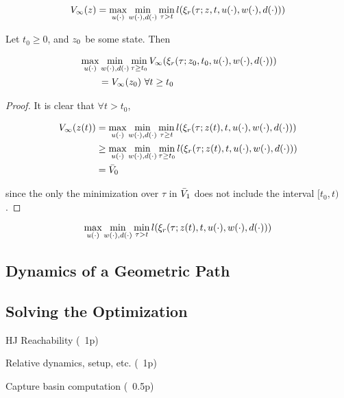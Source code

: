 \begin{equation}
V_\infty(z) = \max_{u(\cdot)} \min_{w(\cdot), d(\cdot)} \min_{\tau>t} l(\xi_r(\tau; z, t, u(\cdot), w(\cdot), d(\cdot))) 
\end{equation}

\begin{thm}
Let $t_0 \geq 0$, and $z_0$ be some state. Then

\begin{equation}
\begin{aligned}
&\max_{u(\cdot)} \min_{w(\cdot), d(\cdot)} \min_{\tau \ge t_0} V_\infty(\xi_r(\tau; z_0, t_0, u(\cdot), w(\cdot), d(\cdot))) \\
&\qquad = V_\infty(z_0)~ \forall t \ge t_0
\end{aligned}
\end{equation}
\end{thm}

\begin{proof}
It is clear that $\forall t > t_0$,
  
\begin{equation}
\begin{aligned}
V_\infty(z(t)) &=\max_{u(\cdot)} \min_{w(\cdot), d(\cdot)} \min_{\tau\ge t} l(\xi_r(\tau; z(t), t, u(\cdot), w(\cdot), d(\cdot))) \\
&\ge \max_{u(\cdot)} \min_{w(\cdot), d(\cdot)} \min_{\tau\ge t_0} l(\xi_r(\tau; z(t), t, u(\cdot), w(\cdot), d(\cdot)))\\ 
&= \bar{V}_0
\end{aligned}
\end{equation}  

\noindent since the only the minimization over $\tau$ in $\bar{V}_1$ does not include the interval $[t_0, t)$.

\end{proof}

\begin{thm}

\begin{equation}
\max_{u(\cdot)} \min_{w(\cdot), d(\cdot)} \min_{\tau>t} l(\xi_r(\tau; z(t), t, u(\cdot), w(\cdot), d(\cdot)))
\end{equation}


\end{thm}

\subsection{Dynamics of a Geometric Path}

\subsection{Solving the Optimization}

HJ Reachability (~1p)

Relative dynamics, setup, etc. (~1p)

Capture basin computation (~0.5p)